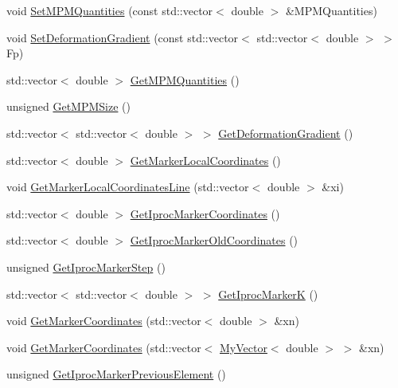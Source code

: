 \begin{DoxyCompactItemize}
\item 
void \mbox{\hyperlink{classfemus_1_1_marker_adfed0efcca0438c2e9df0c310630856f}{Set\+M\+P\+M\+Quantities}} (const std\+::vector$<$ double $>$ \&M\+P\+M\+Quantities)
\item 
void \mbox{\hyperlink{classfemus_1_1_marker_a7c6d2c8d4ae7d219c7d065bcb4b27668}{Set\+Deformation\+Gradient}} (const std\+::vector$<$ std\+::vector$<$ double $>$ $>$ Fp)
\item 
std\+::vector$<$ double $>$ \mbox{\hyperlink{classfemus_1_1_marker_af499049373061d6d6ef69fdb644ee5ae}{Get\+M\+P\+M\+Quantities}} ()
\item 
unsigned \mbox{\hyperlink{classfemus_1_1_marker_ae051128fd53dafb08b15a64c936d76fe}{Get\+M\+P\+M\+Size}} ()
\item 
std\+::vector$<$ std\+::vector$<$ double $>$ $>$ \mbox{\hyperlink{classfemus_1_1_marker_a769d6839c6c0989e6c5aaf14a41bd805}{Get\+Deformation\+Gradient}} ()
\item 
std\+::vector$<$ double $>$ \mbox{\hyperlink{classfemus_1_1_marker_a87e31492a23f98ad9ac0e140a97050c1}{Get\+Marker\+Local\+Coordinates}} ()
\item 
void \mbox{\hyperlink{classfemus_1_1_marker_a01c3f9f19b8a31d70a99afded246f501}{Get\+Marker\+Local\+Coordinates\+Line}} (std\+::vector$<$ double $>$ \&xi)
\item 
std\+::vector$<$ double $>$ \mbox{\hyperlink{classfemus_1_1_marker_a35c7e087d935de1e4088317bc7a8470c}{Get\+Iproc\+Marker\+Coordinates}} ()
\item 
std\+::vector$<$ double $>$ \mbox{\hyperlink{classfemus_1_1_marker_a035b830f94d28088b9052eee48d39602}{Get\+Iproc\+Marker\+Old\+Coordinates}} ()
\item 
unsigned \mbox{\hyperlink{classfemus_1_1_marker_a43c011c82d9c6f22e76b1ab9c7b99cb4}{Get\+Iproc\+Marker\+Step}} ()
\item 
std\+::vector$<$ std\+::vector$<$ double $>$ $>$ \mbox{\hyperlink{classfemus_1_1_marker_a2480e8c69f57128c315e92f5fee37fd2}{Get\+Iproc\+MarkerK}} ()
\item 
void \mbox{\hyperlink{classfemus_1_1_marker_ad22d3d2cf3e739c1292568c5607df777}{Get\+Marker\+Coordinates}} (std\+::vector$<$ double $>$ \&xn)
\item 
void \mbox{\hyperlink{classfemus_1_1_marker_ab2fb6a9e890f4112bf03165a3bdf81c0}{Get\+Marker\+Coordinates}} (std\+::vector$<$ \mbox{\hyperlink{classfemus_1_1_my_vector}{My\+Vector}}$<$ double $>$ $>$ \&xn)
\item 
unsigned \mbox{\hyperlink{classfemus_1_1_marker_a937322e444d7617baba7c25c70f06d76}{Get\+Iproc\+Marker\+Previous\+Element}} ()

\end{DoxyCompactItemize}
